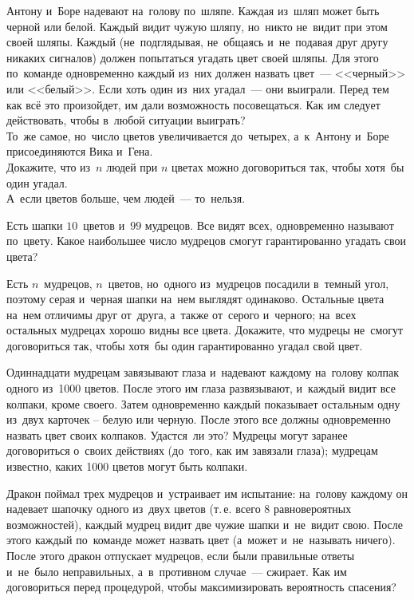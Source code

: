 \begin{problems}
\item
\subproblem
Антону и~Боре надевают на~голову по~шляпе.
Каждая из~шляп может быть черной или белой.
Каждый видит чужую шляпу, но~никто не~видит при этом своей шляпы.
Каждый (не~подглядывая, не~общаясь и~не~подавая друг другу никаких сигналов)
должен попытаться угадать цвет своей шляпы.
Для этого по~команде одновременно каждый из~них должен назвать цвет~---
<<черный>> или <<белый>>.
Если хоть один из~них угадал~--- они выиграли.
Перед тем как всё это произойдет, им дали возможность посовещаться.
Как им следует действовать, чтобы в~любой ситуации выиграть?
\\
\subproblem
То~же самое, но~число цветов увеличивается до~четырех, а~к~Антону и~Боре
присоединяются Вика и~Гена.
\\
\subproblem
Докажите, что из~$n$ людей при $n$ цветах можно договориться так, чтобы хотя~бы
один угадал.
\\
\subproblem
А~если цветов больше, чем людей~--- то~нельзя.


\item
Есть шапки $10$~цветов и~$99$ мудрецов.
Все видят всех, одновременно называют по~цвету.
Какое наибольшее число мудрецов смогут гарантированно угадать свои цвета?

\item
Есть $n$~мудрецов, $n$~цветов, но~одного из~мудрецов посадили в~темный угол,
поэтому серая и~черная шапки на~нем выглядят одинаково.
Остальные цвета на~нем отличимы друг от~друга, а~также от~серого и~черного;
на~всех остальных мудрецах хорошо видны все цвета.
Докажите, что мудрецы не~смогут договориться так, чтобы хотя~бы один
гарантированно угадал свой цвет.

\item
Одиннадцати мудрецам завязывают глаза и~надевают каждому на~голову колпак
одного из~1000 цветов.
После этого им глаза развязывают, и~каждый видит все колпаки, кроме своего.
Затем одновременно каждый показывает остальным одну из~двух карточек – белую
или черную.
После этого все должны одновременно назвать цвет своих колпаков.
Удастся~ли это?
Мудрецы могут заранее договориться о~своих действиях
(до~того, как им завязали глаза);
мудрецам известно, каких 1000 цветов могут быть колпаки.

\item
Дракон поймал трех мудрецов и~устраивает им испытание:
на~голову каждому он надевает шапочку одного из~двух цветов (т.\,е. всего
8 равновероятных возможностей), каждый мудрец видит две чужие шапки и~не~видит
свою.
После этого каждый по~команде может назвать цвет
(а~может и~не~называть ничего).
После этого дракон отпускает мудрецов, если были правильные ответы и~не~было
неправильных, а~в~противном случае~--- сжирает.
Как им договориться перед процедурой, чтобы максимизировать вероятность
спасения?


\end{problems}
